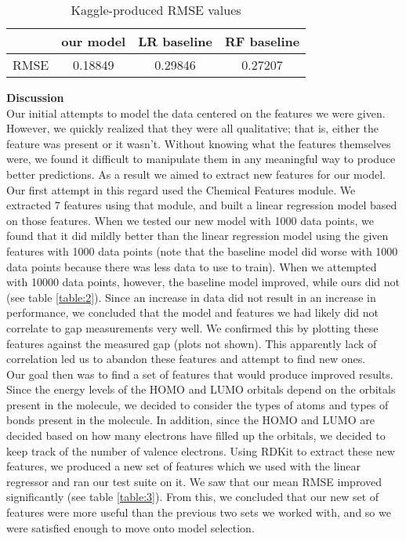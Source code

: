 \documentclass[12pt]{article}
\begin{document}
\begin{table}[h!]
\centering
{\setlength{\tabcolsep}{10pt}
\begin{tabular} {c | c c c}
& our model & LR baseline & RF baseline \\ \hline
RMSE & 0.18849 & 0.29846 & 0.27207\\
\end{tabular}}
\caption{Kaggle-produced RMSE values}
\label{table:5}
\end{table}

\medskip
\bigskip

\textbf{Discussion} \\
Our initial attempts to model the data centered on the features we were given. However, we quickly realized that they were all qualitative; that is, either the feature was present or it wasn't. Without knowing what the features themselves were, we found it difficult to manipulate them in any meaningful way to produce better predictions. As a result we aimed to extract new features for our model. \\

Our first attempt in this regard used the Chemical Features module. We extracted 7 features using that module, and built a linear regression model based on those features. When we tested our new model with 1000 data points, we found that it did mildly better than the linear regression model using the given features with 1000 data points (note that the baseline model did worse with 1000 data points because there was less data to use to train). When we attempted with 10000 data points, however, the baseline model improved, while ours did not (see table \ref{table:2}). Since an increase in data did not result in an increase in performance, we concluded that the model and features we had likely did not correlate to gap measurements very well. We confirmed this by plotting these features against the measured gap (plots not shown). This apparently lack of correlation led us to abandon these features and attempt to find new ones. \\

Our goal then was to find a set of features that would produce improved results. Since the energy levels of the HOMO and LUMO orbitals depend on the orbitals present in the molecule, we decided to consider the types of atoms and types of bonds present in the molecule. In addition, since the HOMO and LUMO are decided based on how many electrons have filled up the orbitals, we decided to keep track of the number of valence electrons. Using RDKit to extract these new features, we produced a new set of features which we used with the linear regressor and ran our test suite on it. We saw that our mean RMSE improved significantly (see table \ref{table:3}). From this, we concluded that our new set of features were more useful than the previous two sets we worked with, and so we were satisfied enough to move onto model selection. \\
\end{document}
